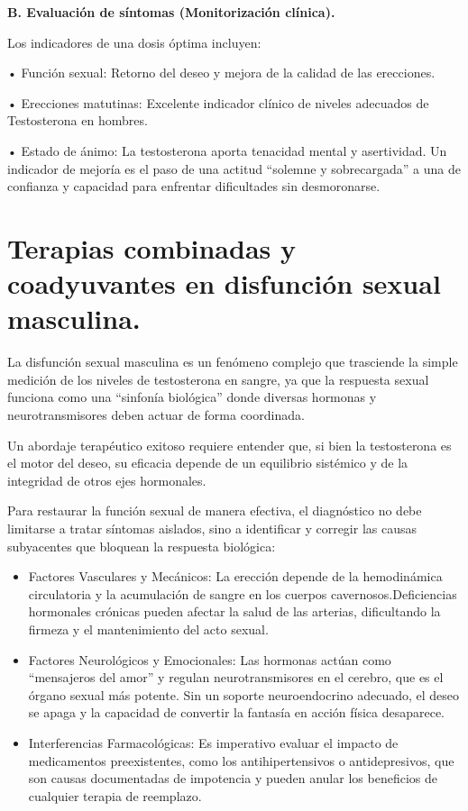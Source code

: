 \documentclass[
  spanish,
]{article}
\begin{document}
\textbf{B. Evaluación de síntomas (Monitorización clínica).}

Los indicadores de una dosis óptima incluyen:

• Función sexual: Retorno del deseo y mejora de la calidad de las erecciones.

• Erecciones matutinas: Excelente indicador clínico de niveles adecuados de Testosterona en hombres.

• Estado de ánimo: La testosterona aporta tenacidad mental y asertividad. Un indicador de mejoría es el paso de una actitud ``solemne y sobrecargada'' a una de confianza y capacidad para enfrentar dificultades sin desmoronarse.

\section{Terapias combinadas y coadyuvantes en disfunción sexual masculina.}\label{Terapias}

La disfunción sexual masculina es un fenómeno complejo que trasciende la simple medición de los niveles de testosterona en sangre, ya que la respuesta sexual funciona como una ``sinfonía biológica'' donde diversas hormonas y neurotransmisores deben actuar de forma coordinada.

Un abordaje terapéutico exitoso requiere entender que, si bien la testosterona es el motor del deseo, su eficacia depende de un equilibrio sistémico y de la integridad de otros ejes hormonales.

Para restaurar la función sexual de manera efectiva, el diagnóstico no debe limitarse a tratar síntomas aislados, sino a identificar y corregir las causas subyacentes que bloquean la respuesta biológica:

\begin{itemize}
\item
  Factores Vasculares y Mecánicos: La erección depende de la hemodinámica circulatoria y la acumulación de sangre en los cuerpos cavernosos.Deficiencias hormonales crónicas pueden afectar la salud de las arterias, dificultando la firmeza y el mantenimiento del acto sexual.
\item
  Factores Neurológicos y Emocionales: Las hormonas actúan como ``mensajeros del amor'' y regulan neurotransmisores en el cerebro, que es el órgano sexual más potente.
  Sin un soporte neuroendocrino adecuado, el deseo se apaga y la capacidad de convertir la fantasía en acción física desaparece.
\item
  Interferencias Farmacológicas: Es imperativo evaluar el impacto de medicamentos preexistentes, como los antihipertensivos o antidepresivos, que son causas documentadas de impotencia y pueden anular los beneficios de cualquier terapia de reemplazo.
\end{itemize}
\end{document}
